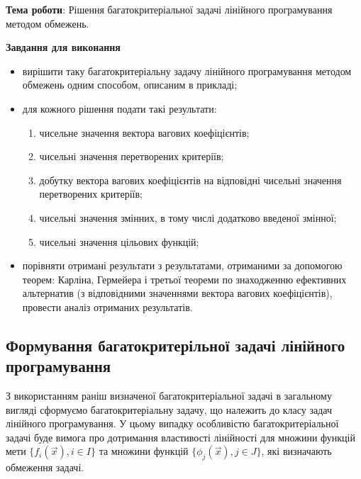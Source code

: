 


\newcommand{\labnumber}{4} %



\usepackage{systeme}
\usepackage{longtable,tabu}
\usepackage{multirow}
\usepackage{array,multirow}
\usepackage{pdflscape}
\usepackage{afterpage}
\usepackage{bm}


\Ukrainian


\addtocounter{page}{1}

\textbf{Тема роботи}: Рішення багатокритеріальної задачі лінійного програмування методом обмежень.

\textbf{Завдання для виконання}
\begin{itemize}
	\item вирішити таку багатокритеріальну задачу лінійного програмування методом обмежень одним способом, описаним в прикладі;
	\item для кожного рішення подати такі результати:
	\begin{enumerate}[label=\arabic*)]
		\item чисельне значення вектора вагових коефіцієнтів;
		\item чисельні значення перетворених критеріїв;
		\item добутку вектора вагових коефіцієнтів на відповідні чисельні значення перетворених критеріїв;
		\item чисельні значення змінних, в тому числі додатково введеної змінної;
		\item чисельні значення цільових функцій;
	\end{enumerate}
	\item порівняти отримані результати з результатами, отриманими за допомогою теорем: Карліна, Гермейера і третьої теореми по знаходженню ефективних альтернатив (з відповідними значеннями вектора вагових коефіцієнтів), провести аналіз отриманих результатів.
\end{itemize}



\subsection{Формування багатокритерільної задачі лінійного програмування}

З використанням раніш визначеної багатокритеріальної задачі в загальному вигляді сформуємо багатокритеріальну задачу, що належить до класу задач лінійного програмування. 
У цьому випадку особливістю багатокритеріальної задачі буде вимога про дотримання властивості лінійності для множини функцій мети $\{ f_i(\vec{x}), i \in I \}$ та множини функцій $\{ \phi_j(\vec{x}), j \in J\}$, які визначають обмеження задачі.

